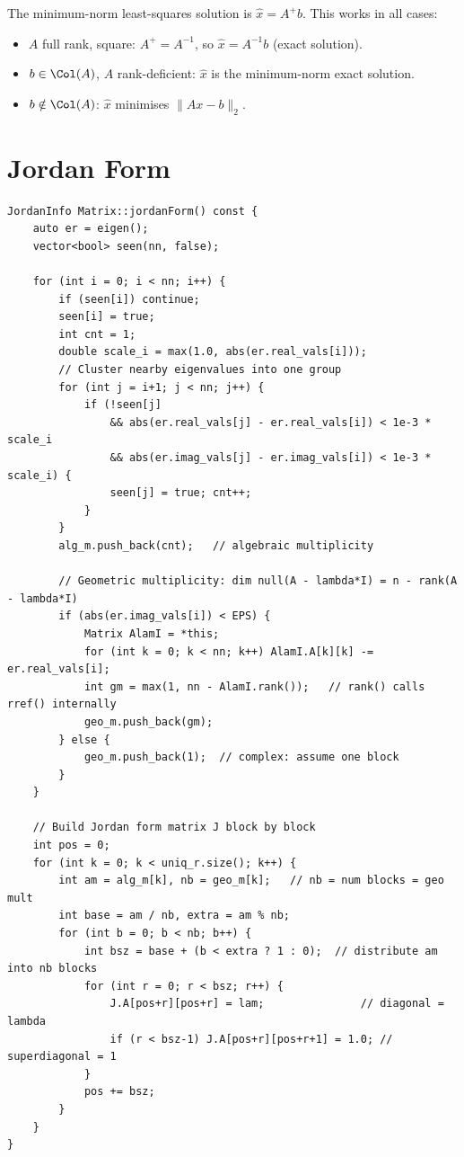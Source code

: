 \documentclass[12pt, a4paper]{article}
\begin{document}
The minimum-norm least-squares solution is $\hat{x} = A^+ b$.  This works
in all cases:
\begin{itemize}[noitemsep]
  \item $A$ full rank, square: $A^+ = A^{-1}$, so $\hat{x} = A^{-1}b$ (exact solution).
  \item $b \in \Col(A)$, $A$ rank-deficient: $\hat{x}$ is the minimum-norm
        exact solution.
  \item $b \notin \Col(A)$: $\hat{x}$ minimises $\|Ax - b\|_2$.
\end{itemize}

\section{Jordan Form}

\begin{lstlisting}
JordanInfo Matrix::jordanForm() const {
    auto er = eigen();
    vector<bool> seen(nn, false);

    for (int i = 0; i < nn; i++) {
        if (seen[i]) continue;
        seen[i] = true;
        int cnt = 1;
        double scale_i = max(1.0, abs(er.real_vals[i]));
        // Cluster nearby eigenvalues into one group
        for (int j = i+1; j < nn; j++) {
            if (!seen[j]
                && abs(er.real_vals[j] - er.real_vals[i]) < 1e-3 * scale_i
                && abs(er.imag_vals[j] - er.imag_vals[i]) < 1e-3 * scale_i) {
                seen[j] = true; cnt++;
            }
        }
        alg_m.push_back(cnt);   // algebraic multiplicity

        // Geometric multiplicity: dim null(A - lambda*I) = n - rank(A - lambda*I)
        if (abs(er.imag_vals[i]) < EPS) {
            Matrix AlamI = *this;
            for (int k = 0; k < nn; k++) AlamI.A[k][k] -= er.real_vals[i];
            int gm = max(1, nn - AlamI.rank());   // rank() calls rref() internally
            geo_m.push_back(gm);
        } else {
            geo_m.push_back(1);  // complex: assume one block
        }
    }

    // Build Jordan form matrix J block by block
    int pos = 0;
    for (int k = 0; k < uniq_r.size(); k++) {
        int am = alg_m[k], nb = geo_m[k];   // nb = num blocks = geo mult
        int base = am / nb, extra = am % nb;
        for (int b = 0; b < nb; b++) {
            int bsz = base + (b < extra ? 1 : 0);  // distribute am into nb blocks
            for (int r = 0; r < bsz; r++) {
                J.A[pos+r][pos+r] = lam;               // diagonal = lambda
                if (r < bsz-1) J.A[pos+r][pos+r+1] = 1.0; // superdiagonal = 1
            }
            pos += bsz;
        }
    }
}
\end{lstlisting}
\end{document}
